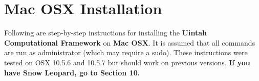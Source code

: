 \documentclass[11pt,fleqn]{book} %
\begin{document}


\chapter{Mac OSX Installation}

Following are step-by-step instructions for installing the
\textbf{Uintah Computational Framework} on \textbf{Mac OSX}.  It is
assumed that all commands are run as administrator (which may require
a sudo).  These instructions were tested on OSX 10.5.6 and 10.5.7 but
should work on previous versions.  \textbf{If you have Snow Leopard,
go to Section 10.}
\end{document}
